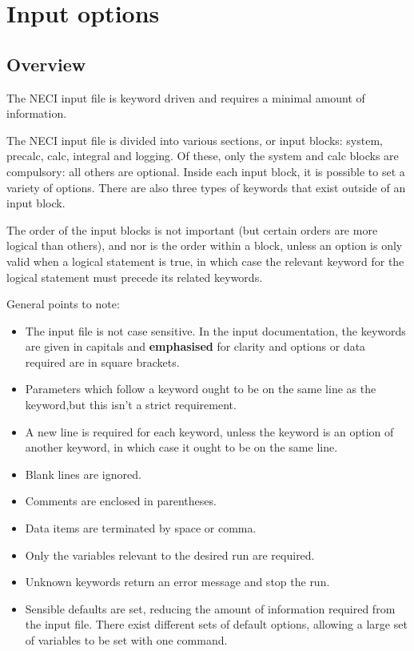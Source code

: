 \documentclass[openany,a4paper,10pt]{manual}
\begin{document}
\resetcurrentobjects


\hypertarget{input-index}{}\chapter{Input options}

\resetcurrentobjects


\hypertarget{input-overview}{}\section{Overview}

The NECI input file is keyword driven and requires a minimal amount of information.

The NECI input file is divided into various sections, or input blocks: system, precalc, calc, integral and logging.  Of these, only the system and calc blocks are compulsory: all others are optional.  Inside each input block, it is possible to set a variety of options.  There are also three types of keywords that exist outside of an input block.

The order of the input blocks is not important (but certain orders are more logical than others), and nor is the order within a block, unless an option is only valid when a logical statement is true, in which case the relevant keyword for the logical statement must precede its related keywords.

General points to note:
\begin{itemize}
\item {} 
The input file is not case sensitive.  In the input documentation, the keywords are given in capitals and \textbf{emphasised} for clarity and options or data required are in square brackets.

\item {} 
Parameters which follow a keyword ought to be on the same line as the keyword,but this isn't a strict requirement.

\item {} 
A new line is required for each keyword, unless the keyword is an option of another keyword, in which case it ought to be on the same line.

\item {} 
Blank lines are ignored.

\item {} 
Comments are enclosed in parentheses.

\item {} 
Data items are terminated by space or comma.

\item {} 
Only the variables relevant to the desired run are required.

\item {} 
Unknown keywords return an error message and stop the run.

\item {} 
Sensible defaults are set, reducing the amount of information required from the input file.  There exist different sets of default options, allowing a large set of variables to be set with one command.

\end{itemize}
\end{document}
